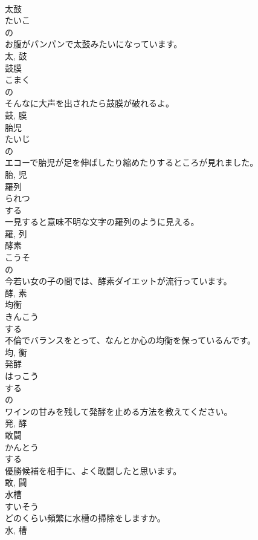 \documentclass[8pt]{extreport}
\begin{document}
\begin{CJK}{UTF8}{min}
\\	太鼓	
\\	たいこ	
\\	の 
\\	お腹がパンパンで太鼓みたいになっています。	
\\	太, 鼓	
\\	鼓膜	
\\	こまく	
\\	の 
\\	そんなに大声を出されたら鼓膜が破れるよ。	
\\	鼓, 膜	
\\	胎児	
\\	たいじ	
\\	の 
\\	エコーで胎児が足を伸ばしたり縮めたりするところが見れました。	
\\	胎, 児	
\\	羅列	
\\	られつ	
\\	する 
\\	一見すると意味不明な文字の羅列のように見える。	
\\	羅, 列	
\\	酵素	
\\	こうそ	
\\	の 
\\	今若い女の子の間では、酵素ダイエットが流行っています。	
\\	酵, 素	
\\	均衡	
\\	きんこう	
\\	する 
\\	不倫でバランスをとって、なんとか心の均衡を保っているんです。	
\\	均, 衡	
\\	発酵	
\\	はっこう	
\\	する 
\\	の 
\\	ワインの甘みを残して発酵を止める方法を教えてください。	
\\	発, 酵	
\\	敢闘	
\\	かんとう	
\\	する 
\\	優勝候補を相手に、よく敢闘したと思います。	
\\	敢, 闘	
\\	水槽	
\\	すいそう	
\\	どのくらい頻繁に水槽の掃除をしますか。	
\\	水, 槽	

\end{CJK}
\end{document}
